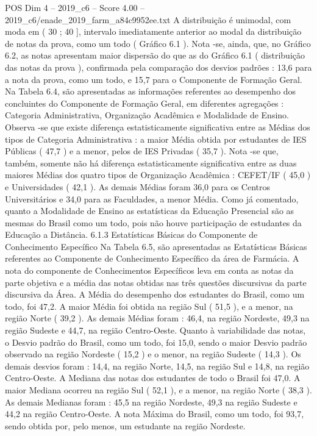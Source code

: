 \begin{textsample}{POS Dim 4 – 2019\_c6 – Score 4.00 – 2019\_c6/enade\_2019\_farm\_a84c9952ee.txt}
A distribuição é unimodal, com moda em ( 30 ; 40 ], intervalo imediatamente anterior ao modal da distribuição de notas da prova, como um todo ( Gráfico 6.1 ).
Nota -se, ainda, que, no Gráfico 6.2, as notas apresentam maior dispersão do que as do Gráfico 6.1 ( distribuição das notas da prova ), confirmada pela comparação dos desvios padrões : 13,6 para a nota da prova, como um todo, e 15,7 para o Componente de Formação Geral.
Na Tabela 6.4, são apresentadas as informações referentes ao desempenho dos concluintes do Componente de Formação Geral, em diferentes agregações : Categoria Administrativa, Organização Acadêmica e Modalidade de Ensino.
Observa -se que existe diferença estatisticamente significativa entre as Médias dos tipos de Categoria Administrativa : a maior Média obtida por estudantes de IES Públicas ( 47,7 ) e a menor, pelos de IES Privadas ( 35,7 ).
Nota -se que, também, somente não há diferença estatisticamente significativa entre as duas maiores Médias dos quatro tipos de Organização Acadêmica : CEFET/IF ( 45,0 ) e Universidades ( 42,1 ).
As demais Médias foram 36,0 para os Centros Universitários e 34,0 para as Faculdades, a menor Média.
Como já comentado, quanto a Modalidade de Ensino as estatísticas da Educação Presencial são as mesmas do Brasil como um todo, pois não houve participação de estudantes da Educação a Distância. 6.1.3 Estatísticas Básicas do Componente de Conhecimento Específico Na Tabela 6.5, são apresentadas as Estatísticas Básicas referentes ao Componente de Conhecimento Específico da área de Farmácia.
A nota do componente de Conhecimentos Específicos leva em conta as notas da parte objetiva e a média das notas obtidas nas três questões discursivas da parte discursiva da Área.
A Média do desempenho dos estudantes do Brasil, como um todo, foi 47,2.
A maior Média foi obtida na região Sul ( 51,5 ), e a menor, na região Norte ( 39,2 ).
As demais Médias foram : 46,4, na região Nordeste, 49,3 na região Sudeste e 44,7, na região Centro-Oeste.
Quanto à variabilidade das notas, o Desvio padrão do Brasil, como um todo, foi 15,0, sendo o maior Desvio padrão observado na região Nordeste ( 15,2 ) e o menor, na região Sudeste ( 14,3 ).
Os demais desvios foram : 14,4, na região Norte, 14,5, na região Sul e 14,8, na região Centro-Oeste.
A Mediana das notas dos estudantes de todo o Brasil foi 47,0.
A maior Mediana ocorreu na região Sul ( 52,1 ), e a menor, na região Norte ( 38,3 ).
As demais Medianas foram : 45,5 na região Nordeste, 49,3 na região Sudeste e 44,2 na região Centro-Oeste.
A nota Máxima do Brasil, como um todo, foi 93,7, sendo obtida por, pelo menos, um estudante na região Nordeste.

\end{textsample}
